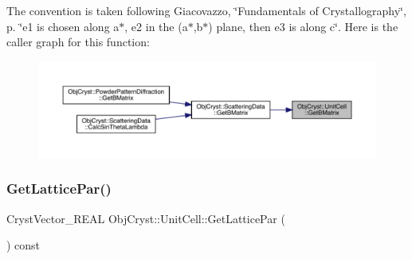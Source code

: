 The convention is taken following Giacovazzo, \char`\"{}\+Fundamentals of Crystallography\char`\"{}, p. \char`\"{}e1 is chosen along a$\ast$, e2 in the (a$\ast$,b$\ast$) plane, then e3 is along c\char`\"{}. Here is the caller graph for this function\+:
\nopagebreak
\begin{figure}[H]
\begin{center}
\leavevmode
\includegraphics[width=350pt]{class_obj_cryst_1_1_unit_cell_ac0cdfda8a5ebab4ee60f3e55dc37c9a3_icgraph}
\end{center}
\end{figure}
\mbox{\label{class_obj_cryst_1_1_unit_cell_a176768bac4762fa188a0e30c255c19fb}} 
\subsubsection{\texorpdfstring{GetLatticePar()}{GetLatticePar()}\hspace{0.1cm}{\footnotesize\ttfamily [1/2]}}
{\footnotesize\ttfamily Cryst\+Vector\+\_\+\+R\+E\+AL Obj\+Cryst\+::\+Unit\+Cell\+::\+Get\+Lattice\+Par (\begin{DoxyParamCaption}{ }\end{DoxyParamCaption}) const}

